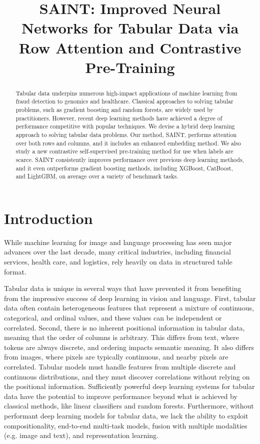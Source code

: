 \title{SAINT: Improved Neural Networks for Tabular Data via Row Attention and Contrastive Pre-Training}

\begin{abstract}
Tabular data underpins numerous high-impact applications of machine learning from fraud detection to genomics and healthcare.  Classical approaches to solving tabular problems, such as gradient boosting and random forests, are widely used by practitioners.  However, recent deep learning methods have achieved a degree of performance competitive with popular techniques.  We devise a hybrid deep learning approach to solving tabular data problems.  Our method, SAINT, performs attention over both rows and columns, and it includes an enhanced embedding method.  We also study a new contrastive self-supervised pre-training method for use when labels are scarce.  SAINT consistently improves performance over previous deep learning methods, and it even outperforms gradient boosting methods, including XGBoost, CatBoost, and LightGBM, on average over a variety of benchmark tasks.
\end{abstract}

\section{Introduction}
\label{sec:introduction}
While machine learning for image and language processing has seen major advances over the last decade, many critical industries, including financial services, health care, and logistics, rely heavily on data in structured table format. 

Tabular data is unique in several ways that have prevented it from benefiting from the impressive success of deep learning in vision and language. First, tabular data often contain heterogeneous features that represent a mixture of continuous, categorical, and ordinal values, and these values can be independent or correlated. Second, there is no inherent positional information in tabular data, meaning that the order of columns is arbitrary. This differs from text, where tokens are always discrete, and ordering impacts semantic meaning.  It also differs from images, where pixels are typically continuous, and nearby pixels are correlated. Tabular models must handle features from multiple discrete and continuous distributions, and they must discover correlations without relying on the positional information. Sufficiently powerful deep learning systems for tabular data have the potential to improve performance beyond what is achieved by classical methods, like linear classifiers and random forests.  Furthermore, without performant deep learning models for tabular data, we lack the ability to exploit compositionality, end-to-end multi-task models, fusion with multiple modalities (e.g. image and text), and representation learning. 

